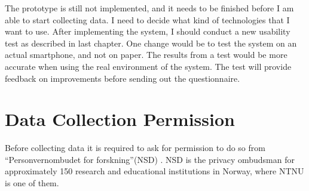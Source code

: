   The prototype is still not implemented, and it needs to be finished before I am able to start collecting data. I need to decide what kind of technologies that I want to use. After implementing the system, I should conduct a new usability test as described in last chapter. One change would be to test the system on an actual smartphone, and not on paper. The results from a test would be more accurate when using the real environment of the system. The test will provide feedback on improvements before sending out the questionnaire. 

\section{Data Collection Permission}

  Before collecting data it is required to ask for permission to do so from ``Personvernombudet for forskning''(NSD) \cite{personvernombud}. NSD is the privacy ombudsman for approximately 150 research and educational institutions in Norway, where NTNU is one of them. 